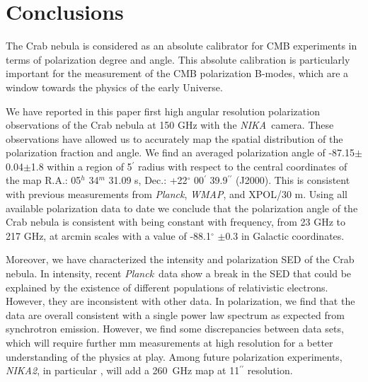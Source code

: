 \documentclass[twocolumn,traditabstract]{aa}
\def\NIKA{\textit{NIKA}}
\def\NIKAd{\textit{NIKA2}}
\def\Planck{\textit{Planck}}
\def\WMAP{\textit{WMAP}}
\begin{document}


\section{Conclusions}\label{sec:conclusions}
The Crab nebula is considered as an absolute calibrator for CMB experiments in
terms of polarization degree and angle. This absolute calibration is
particularly important for the measurement of the CMB polarization B-modes,
which are a window towards the physics of the early Universe.

We have reported in this paper first high angular resolution polarization observations
of the Crab nebula at 150 GHz with the \NIKA\ camera. These observations have
allowed us to accurately map the spatial distribution of the polarization
fraction and angle.  We find an averaged polarization angle of
-87.15$\pm$0.04$\pm$1.8 within a region of 5$^\prime$ radius with respect to the
central coordinates of the map R.A.: 05$^{h}$ 34$^{m}$ 31.09 s, Dec.:
+22$^{\circ}$ 00$^{\prime}$ 39.9$^{\prime\prime}$ (J2000).  This is consistent with
previous measurements from \Planck, \WMAP, and XPOL/30 m.
Using all available polarization data to date we conclude that the
polarization angle of the Crab nebula is consistent with being constant with
frequency, from 23 GHz to 217 GHz, at arcmin scales with a value of
-88.1$^{\circ}$ $\pm$0.3 in Galactic coordinates.

Moreover, we have characterized the intensity and polarization SED of the Crab nebula. In intensity, recent \Planck\ data show a break in the SED that could be explained by the existence of different populations of relativistic electrons. However, they are inconsistent with other data. In polarization, we find that the data are overall consistent with a single power law spectrum as expected from synchrotron emission. However, we find some discrepancies between data sets, which will require further mm measurements at high resolution for a better understanding of the physics at play. Among future polarization experiments, \NIKAd, in particular \citep{calvo2016}, will add a 260~GHz map at 11$^{\prime\prime}$ resolution.
\end{document}
